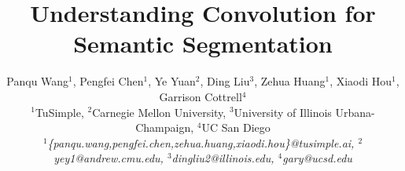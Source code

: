 \documentclass[10pt,twocolumn,letterpaper]{article}
\begin{document}
\title{Understanding Convolution for Semantic Segmentation}

\author[Wang et al.]{Panqu Wang$^1$, Pengfei Chen$^1$, Ye Yuan$^{2}$,
       Ding Liu$^3$, Zehua Huang$^1$, Xiaodi Hou$^1$,
       Garrison Cottrell$^4$\\
       $^1$TuSimple,
       $^2$Carnegie Mellon University,
       $^3$University of Illinois Urbana-Champaign,
       $^4$UC San Diego\\
       \textit{$^1$\{panqu.wang,pengfei.chen,zehua.huang,xiaodi.hou\}@tusimple.ai,
       	       $^2$yey1@andrew.cmu.edu,
               $^3$dingliu2@illinois.edu,
               $^4$gary@ucsd.edu}
       }
\maketitle
\ifwacvfinal\thispagestyle{empty}\fi
\end{document}
